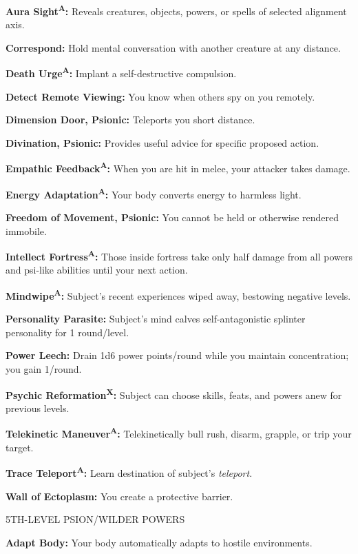 \documentclass{article}
\begin{document}
\textbf{Aura Sight}\textsuperscript{\textbf{A}}\textbf{: }Reveals creatures, objects, 
powers, or spells of selected alignment axis.

\textbf{Correspond: }Hold mental conversation with another creature at any distance.

\textbf{Death Urge}\textsuperscript{\textbf{A}}\textbf{: }Implant a self-destructive 
compulsion.

\textbf{Detect Remote Viewing: }You know when others spy on you remotely.

\textbf{Dimension Door, Psionic: }Teleports you short distance.

\textbf{Divination, Psionic: }Provides useful advice for specific proposed action.

\textbf{Empathic Feedback}\textsuperscript{\textbf{A}}\textbf{: }When you are hit 
in melee, your attacker takes damage.

\textbf{Energy Adaptation}\textsuperscript{\textbf{A}}\textbf{: }Your body converts 
energy to harmless light.

\textbf{Freedom of Movement, Psionic: }You cannot be held or otherwise rendered 
immobile.

\textbf{Intellect Fortress}\textsuperscript{\textbf{A}}\textbf{: }Those inside 
fortress take only half damage from all powers and psi-like abilities until your 
next action.

\textbf{Mindwipe}\textsuperscript{\textbf{A}}\textbf{: }Subject's recent experiences 
wiped away, bestowing negative levels.

\textbf{Personality Parasite: }Subject's mind calves self-antagonistic splinter 
personality for 1 round/level.

\textbf{Power Leech: }Drain 1d6 power points/round while you maintain concentration; 
you gain 1/round.

\textbf{Psychic Reformation}\textsuperscript{\textbf{X}}\textbf{: }Subject can 
choose skills, feats, and powers anew for previous levels.

\textbf{Telekinetic Maneuver}\textsuperscript{\textbf{A}}\textbf{: }Telekinetically 
bull rush, disarm, grapple, or trip your target.

\textbf{Trace Teleport}\textsuperscript{\textbf{A}}\textbf{: }Learn destination 
of subject's \textit{teleport}.

\textbf{Wall of Ectoplasm: }You create a protective barrier.

5TH-LEVEL PSION/WILDER POWERS

\textbf{Adapt Body: }Your body automatically adapts to hostile environments.
\end{document}
